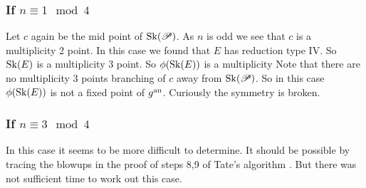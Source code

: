 \subsubsection{If $n \equiv 1 \mod 4$} \label{sec:if_n_equiv_1_mod_4$}

Let $c$ again be the mid point of $\operatorname{Sk}(\mathscr P)$. 
As $n$ is odd we see that $c$ is a multiplicity 2 point. 
In this case we found that $E$ has reduction type $\mathrm{IV}$. 
So $\operatorname{Sk}(E)$ is a multiplicity 3 point. 
So $\phi(\sk(E))$ is a multiplicity 
Note that there are no multiplicity 3 points branching of $c$ away from $\operatorname{Sk}(\mathscr P)$. 
So in this case  $\phi(\sk(E))$ is not a fixed point of $g{}^{\text{an}}$.  
Curiously the symmetry is broken. 


\subsubsection{If $n \equiv 3 \mod 4$ } \label{sec:if_n_equiv_3_mod_4}
In this case it seems to be more difficult to determine. 
It should be possible by tracing the blowups in the proof of steps 8,9 of Tate's algorithm \cite[p. 374-376]{silvermanAdvancedTopicsArithmetic1994}.
But there was not sufficient time to work out this case. 

